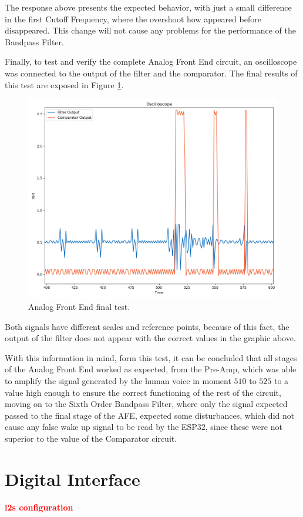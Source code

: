 The response above presents the expected behavior, with just a small difference in the first Cutoff Frequency, where the overshoot how appeared before disappeared. This change will not cause any problems for the performance of the Bandpass Filter.

Finally, to test and verify the complete Analog Front End circuit, an oscilloscope was connected to the output of the filter and the comparator. The final results of this test are exposed in Figure \ref{fig:AFETest}.

\begin{figure}[H]
    \centering
    \includegraphics*[scale = 0.5]{Images/AFEtest.png}
    \caption{Analog Front End final test.}
    \label{fig:AFETest}
\end{figure}

Both signals have different scales and reference points, because of this fact, the output of the filter does not appear with the correct values in the graphic above. 

With this information in mind, form this test, it can be concluded that all stages of the Analog Front End worked as expected, from the Pre-Amp, which was able to amplify the signal generated by the human voice in moment $510$ to $525$ to a value high enough to ensure the correct functioning of the rest of the circuit, moving on to the Sixth Order Bandpass Filter, where only the signal expected passed to the final stage of the AFE, expected some disturbances, which did not cause any false wake up signal to be read by the ESP32, since these were not superior to the value of the Comparator circuit. 

\section{Digital Interface}

\textcolor{red}{\textbf{i2s configuration}}
